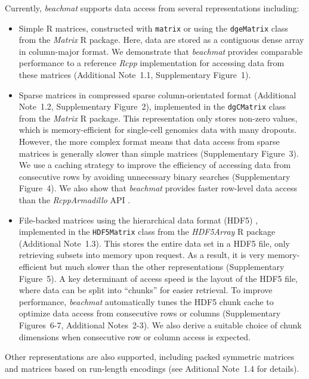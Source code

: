\documentclass[10pt,letterpaper]{article}
\newcommand{\suppfigsimpleaccess}{1}
\newcommand{\suppfigsparseschem}{2}
\newcommand{\suppfigsparsecol}{3}
\newcommand{\suppfigsparserow}{4}
\newcommand{\suppfighdfspeed}{5}
\newcommand{\suppfighdflayout}{6-7}
\newcommand{\suppsecsimple}{1.1}
\newcommand{\suppsecsparse}{1.2}
\newcommand{\suppsechdfmat}{1.3}
\newcommand{\suppsecother}{1.4}
\newcommand{\suppseclayoutoptim}{2}
\newcommand{\suppseclayouttest}{3}
\newcommand{\beachmat}{\textit{beachmat}}
\begin{document}
Currently, \beachmat{} supports data access from several representations including:
\begin{itemize}
    \item Simple R matrices, constructed with \texttt{matrix} or using the \texttt{dgeMatrix} class from the \textit{Matrix} R package.
        Here, data are stored as a contiguous dense array in column-major format.
        We demonstrate that \beachmat{} provides comparable performance to a reference \textit{Rcpp} implementation for accessing data from these matrices 
        (Additional Note~\suppsecsimple{}, Supplementary Figure~\suppfigsimpleaccess{}). 
    \item Sparse matrices in compressed sparse column-orientated format (Additional Note~\suppsecsparse{}, Supplementary Figure~\suppfigsparseschem{}), 
        implemented in the \texttt{dgCMatrix} class from the \textit{Matrix} R package.
        This representation only stores non-zero values, which is memory-efficient for single-cell genomics data with many dropouts.
        However, the more complex format means that data access from sparse matrices is generally slower than simple matrices (Supplementary Figure~\suppfigsparsecol{}).
        We use a caching strategy to improve the efficiency of accessing data from consecutive rows by avoiding unnecessary binary searches (Supplementary Figure~\suppfigsparserow{}).
        We also show that \beachmat{} provides faster row-level data access than the \textit{RcppArmadillo} API \cite{eddelbuettel2014arma}.
    \item File-backed matrices using the hierarchical data format (HDF5) \cite{hdf5}, 
        implemented in the \texttt{HDF5Matrix} class from the \textit{HDF5Array} R package (Additional Note~\suppsechdfmat{}).
        This stores the entire data set in a HDF5 file, only retrieving subsets into memory upon request.
        As a result, it is very memory-efficient but much slower than the other representations (Supplementary Figure~\suppfighdfspeed{}).
        A key determinant of access speed is the layout of the HDF5 file, where data can be split into ``chunks'' for easier retrieval.
        To improve performance, \beachmat{} automatically tunes the HDF5 chunk cache to optimize data access from consecutive rows or columns (Supplementary Figures~\suppfighdflayout{}, Additional Notes~\suppseclayoutoptim{}-\suppseclayouttest{}).
        We also derive a suitable choice of chunk dimensions when consecutive row or column access is expected.
\end{itemize}
Other representations are also supported, including packed symmetric matrices and matrices based on run-length encodings (see Aditional Note~\suppsecother{} for details).
\end{document}
